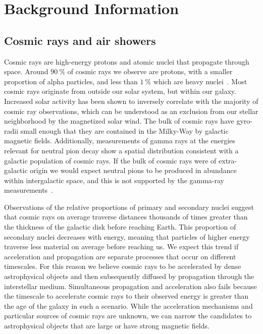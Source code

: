 \chapter{Background Information}\label{chapter:background}

\section{Cosmic rays and air showers}

Cosmic rays are high-energy protons and atomic nuclei that propagate through space.
Around $\SI{90}\percent$ of cosmic rays we observe are protons, with a smaller proportion of alpha particles, and less than $\SI{1}\percent$ which are heavy nuclei~\cite{Gaisser:2016uoy}.
Most cosmic rays originate from outside our solar system, but within our galaxy.
Increased solar activity has been shown to inversely correlate with the majority of cosmic ray observations, which can be understood as an exclusion from our stellar neighborhood by the magnetized solar wind.
The bulk of cosmic rays have gyro-radii small enough that they are contained in the Milky-Way by galactic magnetic fields.
Additionally, measurements of gamma rays at the energies relevant for neutral pion decay show a spatial distribution consistent with a galactic population of cosmic rays.
If the bulk of cosmic rays were of extra-galactic origin we would expect neutral pions to be produced in abundance within intergalactic space, and this is not supported by the gamma-ray measurements~\cite{Abdo:2009mr}.

Observations of the relative proportions of primary and secondary nuclei suggest that cosmic rays on average traverse distances thousands of times greater than the thickness of the galactic disk before reaching Earth.
This proportion of secondary nuclei decreases with energy, meaning that particles of higher energy traverse less material on average before reaching us.
We expect this trend if acceleration and propagation are separate processes that occur on different timescales.
For this reason we believe cosmic rays to be accelerated by dense astrophysical objects and then subsequently diffused by propagation through the interstellar medium.
Simultaneous propagation and acceleration also fails because the timescale to accelerate cosmic rays to their observed energy is greater than the age of the galaxy in such a scenario.
While the acceleration mechanisms and particular sources of cosmic rays are unknown, we can narrow the candidates to astrophysical objects that are large or have strong magnetic fields.

